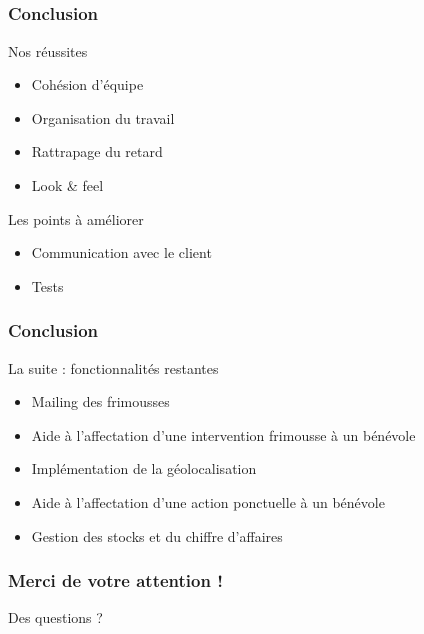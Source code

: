 \subsection{} %

\speaker{\Francois}
\begin{frame}
\frametitle{Conclusion}
\begin{block}{Nos réussites}
	\begin{itemize}
		\item Cohésion d'équipe
		\item Organisation du travail
		\item Rattrapage du retard
		\item Look \& feel
	\end{itemize}
\end{block}
\begin{block}{Les points à améliorer}
	\begin{itemize}
		\item Communication avec le client
		\item Tests
	\end{itemize}
\end{block}
\end{frame}
	
\begin{frame}
\frametitle{Conclusion}
\begin{block}{La suite : fonctionnalités restantes}
	\begin{itemize}
		\item Mailing des frimousses
		\item Aide à l'affectation d'une intervention frimousse à un bénévole
		\item Implémentation de la géolocalisation
		\item Aide à l'affectation d'une action ponctuelle à un bénévole
		\item Gestion des stocks et du chiffre d'affaires
	\end{itemize}
\end{block}
\end{frame}

\speaker{}
\begin{frame}
\frametitle{Merci de votre attention !}
\begin{center}\color{black}
\Huge{Des questions ?}
\end{center}
\end{frame}